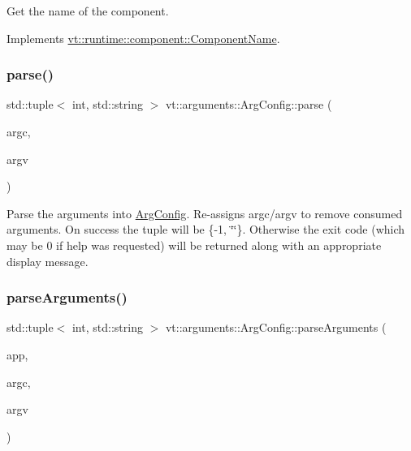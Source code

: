 Get the name of the component. 



Implements \hyperlink{structvt_1_1runtime_1_1component_1_1_component_name_a33c06229bb605a2b2ceff68830d6d773}{vt\+::runtime\+::component\+::\+Component\+Name}.

\mbox{\label{structvt_1_1arguments_1_1_arg_config_a124125d908a910cf52c6c59a3f0f2713}} 
\subsubsection{\texorpdfstring{parse()}{parse()}}
{\footnotesize\ttfamily std\+::tuple$<$ int, std\+::string $>$ vt\+::arguments\+::\+Arg\+Config\+::parse (\begin{DoxyParamCaption}\item[{int \&}]{argc,  }\item[{char $\ast$$\ast$\&}]{argv }\end{DoxyParamCaption})}

Parse the arguments into \hyperlink{structvt_1_1arguments_1_1_arg_config}{Arg\+Config}. Re-\/assigns argc/argv to remove consumed arguments. On success the tuple will be \{-\/1, \char`\"{}\char`\"{}\}. Otherwise the exit code (which may be 0 if help was requested) will be returned along with an appropriate display message. \mbox{\label{structvt_1_1arguments_1_1_arg_config_ac6711ab96113f032b9e0a0b12d24eda3}} 
\subsubsection{\texorpdfstring{parse\+Arguments()}{parseArguments()}}
{\footnotesize\ttfamily std\+::tuple$<$ int, std\+::string $>$ vt\+::arguments\+::\+Arg\+Config\+::parse\+Arguments (\begin{DoxyParamCaption}\item[{C\+L\+I\+::\+App \&}]{app,  }\item[{int \&}]{argc,  }\item[{char $\ast$$\ast$\&}]{argv }\end{DoxyParamCaption})}

